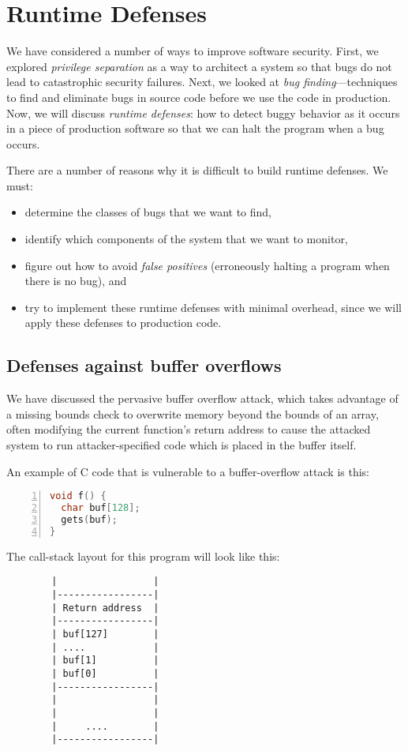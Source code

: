 \chapter{Runtime Defenses}

We have considered a number of ways to improve software security.
First, we explored \emph{privilege separation} as a way to architect
a system so that bugs do not lead to catastrophic security failures.
Next, we looked at \emph{bug finding}---techniques to find and eliminate
bugs in source code before we use the code in production. 
Now, we will discuss \emph{runtime defenses}: how to detect buggy behavior
as it occurs in a piece of production software so that we can halt
the program when a bug occurs.

There are a number of reasons why it is difficult to build runtime
defenses. We must:
\begin{itemize}
\item determine the classes of bugs that we want to find,
\item identify which components of the system that we want to monitor, 
\item figure out how to avoid \emph{false positives} (erroneously halting a program 
      when there is no bug), and
\item try to implement these runtime defenses with minimal overhead,
      since we will apply these defenses to production code.
\end{itemize}

\section{Defenses against buffer overflows}
We have discussed the pervasive buffer overflow attack, which takes advantage of a missing bounds check to overwrite memory beyond the bounds of an array, often modifying the current function's return address to cause the attacked system to run attacker-specified code which is placed in the buffer itself.

An example of C code that is vulnerable to a buffer-overflow attack is this:
\begin{lstlisting}[language=c,numbers=left]
void f() {
  char buf[128];
  gets(buf);
}
\end{lstlisting}

The call-stack layout for this program will look like this:

\begin{verbatim}
        |                 |
        |-----------------|
        | Return address  |
        |-----------------|
        | buf[127]        |
        | ....            |
        | buf[1]          |
        | buf[0]          |
        |-----------------|
        |                 |
        |                 |
        |     ....        |
        |-----------------|
\end{verbatim}

